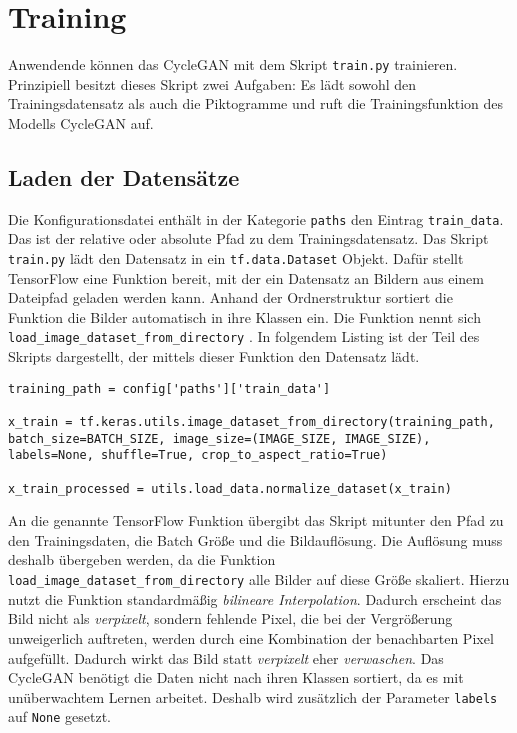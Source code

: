 \section{Training}
Anwendende können das \ac{CycleGAN} mit dem Skript \texttt{train.py} trainieren. Prinzipiell besitzt dieses Skript zwei Aufgaben: Es lädt sowohl den Trainingsdatensatz als auch die Piktogramme und ruft die Trainingsfunktion des Modells \ac{CycleGAN} auf.

\subsection{Laden der Datensätze}
Die Konfigurationsdatei enthält in der Kategorie \texttt{paths} den Eintrag \texttt{train_data}. Das ist der relative oder absolute Pfad zu dem Trainingsdatensatz. Das Skript \texttt{train.py} lädt den Datensatz in ein \texttt{tf.data.Dataset} Objekt. Dafür stellt TensorFlow eine Funktion bereit, mit der ein Datensatz an Bildern aus einem Dateipfad geladen werden kann. Anhand der Ordnerstruktur sortiert die Funktion die Bilder automatisch in ihre Klassen ein. Die Funktion nennt sich \texttt{load_image_dataset_from_directory} \cite{tf-keras-utils}. In folgendem Listing ist der Teil des Skripts dargestellt, der mittels dieser Funktion den Datensatz lädt.

\begin{code}
   \label{code:train-set-laden}
   \begin{verbatim}
training_path = config['paths']['train_data']

x_train = tf.keras.utils.image_dataset_from_directory(training_path, batch_size=BATCH_SIZE, image_size=(IMAGE_SIZE, IMAGE_SIZE), labels=None, shuffle=True, crop_to_aspect_ratio=True)

x_train_processed = utils.load_data.normalize_dataset(x_train)
   \end{verbatim}
\end{code}

An die genannte TensorFlow Funktion übergibt das Skript mitunter den Pfad zu den Trainingsdaten, die Batch Größe und die Bildauflösung. Die Auflösung muss deshalb übergeben werden, da die Funktion \texttt{load_image_dataset_from_directory} alle Bilder auf diese Größe skaliert. Hierzu nutzt die Funktion standardmäßig \emph{bilineare Interpolation}. Dadurch erscheint das Bild nicht als \emph{verpixelt}, sondern fehlende Pixel, die bei der Vergrößerung unweigerlich auftreten, werden durch eine Kombination der benachbarten Pixel aufgefüllt. Dadurch wirkt das Bild statt \emph{verpixelt} eher \emph{verwaschen}. Das \ac{CycleGAN} benötigt die Daten nicht nach ihren Klassen sortiert, da es mit unüberwachtem Lernen arbeitet. Deshalb wird zusätzlich der Parameter \texttt{labels} auf \texttt{None} gesetzt.

